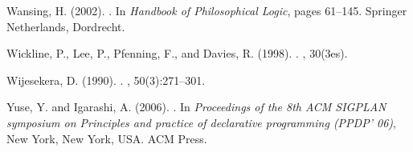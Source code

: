 \documentclass[a4paper]{amsart}
\begin{document}
\begin{thebibliography}{}
Wansing, H. (2002).
.
\newblock In {\em Handbook of Philosophical Logic}, pages 61--145. Springer
  Netherlands, Dordrecht.

Wickline, P., Lee, P., Pfenning, F., and Davies, R. (1998).
.
, 30(3es).

Wijesekera, D. (1990).
.
, 50(3):271--301.

Yuse, Y. and Igarashi, A. (2006).
.
\newblock In {\em Proceedings of the 8th ACM SIGPLAN symposium on Principles
  and practice of declarative programming (PPDP' 06)}, New York, New York, USA.
  ACM Press.

\end{thebibliography}
 
\end{document}
